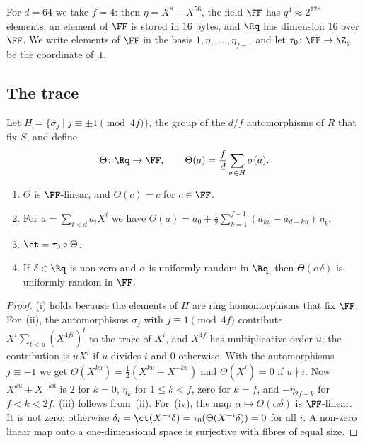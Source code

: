 For $d=64$ we take $f=4$: then $\eta=X^8-X^{56}$, the field $\FF$ has $q^4\approx2^{128}$ elements, an element of $\FF$ is stored in $16$ bytes, and $\Rq$ has dimension $16$ over $\FF$. We write elements of $\FF$ in the basis $1,\eta_1,\dots,\eta_{f-1}$ and let $\tau_0\colon\FF\to\Z_q$ be the coordinate of~$1$.

\subsection{The trace}

Let $H=\{\sigma_j\mid j\equiv\pm1\pmod{4f}\}$, the group of the $d/f$ automorphisms of $R$ that fix $S$, and define
\begin{equation}\label{eq:theta}
\Theta\colon\Rq\to\FF,\qquad\Theta(a)=\frac fd\sum_{\sigma\in H}\sigma(a) .
\end{equation}

\begin{lemma}\label{lem:theta}
\begin{enumerate}[label=(\roman*)]
\item $\Theta$ is $\FF$-linear, and $\Theta(c)=c$ for $c\in\FF$.
\item For $a=\sum_{i<d}a_iX^i$ we have $\Theta(a)=a_0+\frac12\sum_{k=1}^{f-1}(a_{ku}-a_{d-ku})\,\eta_k$.
\item $\ct=\tau_0\circ\Theta$.
\item If $\delta\in\Rq$ is non-zero and $\alpha$ is uniformly random in $\Rq$, then $\Theta(\alpha\delta)$ is uniformly random in $\FF$.
\end{enumerate}
\end{lemma}
\begin{proof}
(i) holds because the elements of $H$ are ring homomorphisms that fix $\FF$. For~(ii), the automorphisms $\sigma_j$ with $j\equiv1\pmod{4f}$ contribute $X^i\sum_{t<u}(X^{4fi})^t$ to the trace of $X^i$, and $X^{4f}$ has multiplicative order $u$; the contribution is $uX^i$ if $u$ divides $i$ and $0$ otherwise. With the automorphisms $j\equiv-1$ we get $\Theta(X^{ku})=\frac12(X^{ku}+X^{-ku})$ and $\Theta(X^i)=0$ if $u\nmid i$. Now $X^{ku}+X^{-ku}$ is $2$ for $k=0$, $\eta_k$ for $1\le k<f$, zero for $k=f$, and $-\eta_{2f-k}$ for $f<k<2f$. (iii) follows from~(ii). For~(iv), the map $\alpha\mapsto\Theta(\alpha\delta)$ is $\FF$-linear. It is not zero: otherwise $\delta_i=\ct(X^{-i}\delta)=\tau_0(\Theta(X^{-i}\delta))=0$ for all $i$. A non-zero linear map onto a one-dimensional space is surjective with fibres of equal size.
\end{proof}

